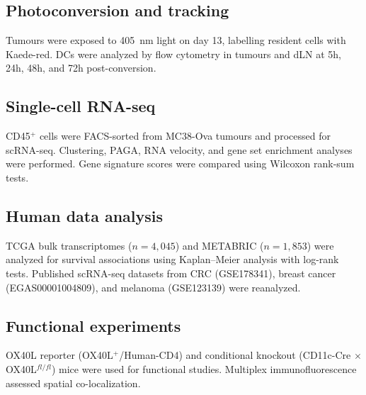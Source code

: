 \documentclass[11pt]{article}
\begin{document}
\subsection{Photoconversion and tracking}
Tumours were exposed to 405~nm light on day 13, labelling resident cells with Kaede-red. DCs were analyzed by flow cytometry in tumours and dLN at 5h, 24h, 48h, and 72h post-conversion.

\subsection{Single-cell RNA-seq}
CD45$^{+}$ cells were FACS-sorted from MC38-Ova tumours and processed for scRNA-seq. Clustering, PAGA, RNA velocity, and gene set enrichment analyses were performed. Gene signature scores were compared using Wilcoxon rank-sum tests.

\subsection{Human data analysis}
TCGA bulk transcriptomes ($n = 4,045$) and METABRIC ($n = 1,853$) were analyzed for survival associations using Kaplan--Meier analysis with log-rank tests. Published scRNA-seq datasets from CRC (GSE178341), breast cancer (EGAS00001004809), and melanoma (GSE123139) were reanalyzed.

\subsection{Functional experiments}
OX40L reporter (OX40L$^{+}$/Human-CD4) and conditional knockout (CD11c-Cre $\times$ OX40L$^{fl/fl}$) mice were used for functional studies. Multiplex immunofluorescence assessed spatial co-localization.


\end{document}
